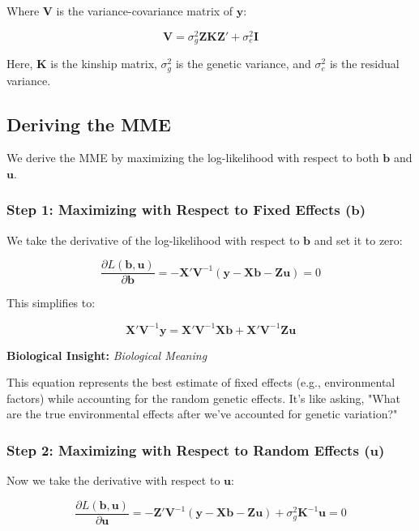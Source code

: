 \documentclass[12pt,a4paper]{article}
\newenvironment{biologicalinsightbox}[1][]
{\begin{basebox}[linecolor=uqpurple]
\textbf{\color{uqpurple}Biological Insight:} \textit{#1}\par\noindent\ignorespaces}
{\end{basebox}}
\begin{document}
Where $\mathbf{V}$ is the variance-covariance matrix of $\mathbf{y}$:

\[
\mathbf{V} = \sigma^2_g\mathbf{ZKZ'} + \sigma^2_e\mathbf{I}
\]

Here, $\mathbf{K}$ is the kinship matrix, $\sigma^2_g$ is the genetic variance, and $\sigma^2_e$ is the residual variance.

\subsection{Deriving the MME}

We derive the MME by maximizing the log-likelihood with respect to both $\mathbf{b}$ and $\mathbf{u}$.

\subsubsection{Step 1: Maximizing with Respect to Fixed Effects ($\mathbf{b}$)}

We take the derivative of the log-likelihood with respect to $\mathbf{b}$ and set it to zero:

\[
\frac{\partial L(\mathbf{b}, \mathbf{u})}{\partial \mathbf{b}} = -\mathbf{X'} \mathbf{V}^{-1} (\mathbf{y} - \mathbf{Xb} - \mathbf{Zu}) = 0
\]

This simplifies to:

\[
\mathbf{X'} \mathbf{V}^{-1} \mathbf{y} = \mathbf{X'} \mathbf{V}^{-1} \mathbf{Xb} + \mathbf{X'} \mathbf{V}^{-1} \mathbf{Zu}
\]

\begin{biologicalinsightbox}[Biological Meaning]
This equation represents the best estimate of fixed effects (e.g., environmental factors) while accounting for the random genetic effects. It's like asking, "What are the true environmental effects after we've accounted for genetic variation?"
\end{biologicalinsightbox}

\subsubsection{Step 2: Maximizing with Respect to Random Effects ($\mathbf{u}$)}

Now we take the derivative with respect to $\mathbf{u}$:

\[
\frac{\partial L(\mathbf{b}, \mathbf{u})}{\partial \mathbf{u}} = -\mathbf{Z'} \mathbf{V}^{-1} (\mathbf{y} - \mathbf{Xb} - \mathbf{Zu}) + \sigma^2_g \mathbf{K}^{-1} \mathbf{u} = 0
\]
\end{document}
